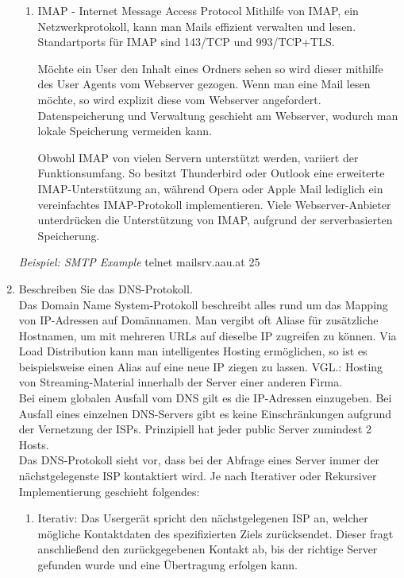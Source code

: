 \documentclass[11pt]{article}
\begin{document}
\begin{enumerate}[\thesection .1]
\begin{enumerate}[$\diamond$]
        \item IMAP - Internet Message Access Protocol
        Mithilfe von IMAP, ein Netzwerkprotokoll, kann man Mails effizient verwalten und lesen.
        Standartports für IMAP sind 143/TCP und 993/TCP+TLS.

        Möchte ein User den Inhalt eines Ordners sehen so wird dieser mithilfe des User Agents vom Webserver gezogen.
        Wenn man eine Mail lesen möchte, so wird explizit diese vom Webserver angefordert.
        Datenspeicherung und Verwaltung geschieht am Webserver, wodurch man lokale Speicherung vermeiden kann.

        Obwohl IMAP von vielen Servern unterstützt werden, variiert der Funktionsumfang.
        So besitzt Thunderbird oder Outlook eine erweiterte IMAP-Unterstützung an,
        während Opera oder Apple Mail lediglich ein vereinfachtes IMAP-Protokoll implementieren.
        Viele Webserver-Anbieter unterdrücken die Unterstützung von IMAP, aufgrund der serverbasierten Speicherung.
    \end{enumerate}

    \emph{Beispiel: SMTP Example}
    telnet mailsrv.aau.at 25





    \item Beschreiben Sie das DNS-Protokoll.\\
        Das Domain Name System-Protokoll beschreibt alles rund um das Mapping von IP-Adressen auf Domännamen.
        Man vergibt oft Aliase für zusätzliche Hostnamen, um mit mehreren URLs auf dieselbe IP zugreifen zu können.
        Via Load Distribution kann man intelligentes Hosting ermöglichen, so ist es beispielsweise einen Alias auf eine neue IP ziegen zu lassen.
        VGL.: Hosting von Streaming-Material innerhalb der Server einer anderen Firma.\\

        Bei einem globalen Ausfall vom DNS gilt es die IP-Adressen einzugeben.
        Bei Ausfall eines einzelnen DNS-Servers gibt es keine Einschränkungen aufgrund der Vernetzung der ISPs.
        Prinzipiell hat jeder public Server zumindest 2 Hosts.\\

        Das DNS-Protokoll sieht vor, dass bei der Abfrage eines Server immer der nächstgelegenste ISP kontaktiert wird.
        Je nach Iterativer oder Rekursiver Implementierung geschieht folgendes:
        \begin{addmargin}[1em]{1em}
            \begin{enumerate}[$\diamond$]
                \item Iterativ: Das Usergerät spricht den nächstgelegenen ISP an, welcher mögliche Kontaktdaten des spezifizierten Ziels zurücksendet.
                Dieser fragt anschließend den zurückgegebenen Kontakt ab, bis der richtige Server gefunden wurde und eine Übertragung erfolgen kann.


\end{enumerate}
\end{addmargin}
\end{enumerate}
\end{document}
